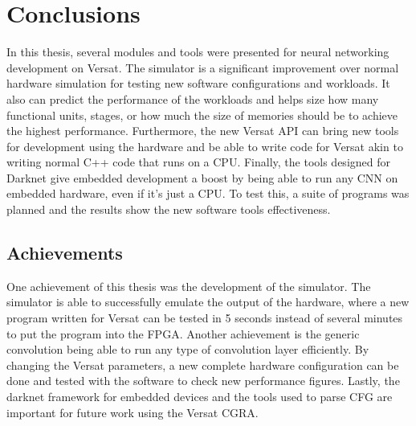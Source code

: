 
\chapter{Conclusions}
\label{chapter:conclusions}

In this thesis, several modules and tools were presented for neural networking development on Versat.
The simulator is a significant improvement over normal hardware simulation for testing new
software configurations and workloads. It also can predict the performance of the workloads
and helps size how many functional units, stages, or how much the size of memories should be
to achieve the highest performance.
Furthermore, the new Versat API can bring new tools for development using the hardware
and be able to write code for Versat akin to writing normal C++ code that runs on a CPU.
Finally, the tools designed for Darknet give embedded development a boost by being able to
run any CNN on embedded hardware, even if it's just a CPU.
To test this, a suite of programs was planned and the results show the new software tools
effectiveness.

\section{Achievements}
\label{section:achievements}

One achievement of this thesis was the development of the simulator. The simulator is able
to successfully emulate the output of the hardware, where a new program written for Versat
can be tested in 5 seconds instead of several minutes to put the program into the FPGA.
Another achievement is the generic convolution being able to run any type of convolution layer
efficiently. By changing the Versat parameters, a new complete hardware configuration can be
done and tested with the software to check new performance figures.
Lastly, the darknet framework for embedded devices and the tools used to parse CFG
are important for future work using the Versat CGRA.

